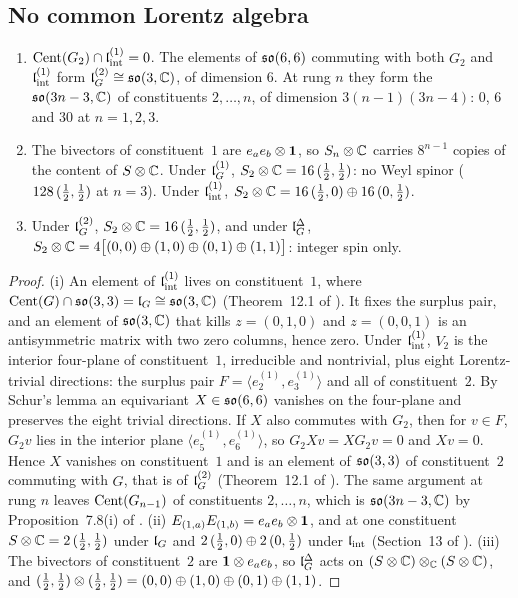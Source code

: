 \subsection{No common Lorentz algebra}
\label{e5:sec:nocommon}

\begin{proposition}
\label{e5:prop:nocommon}
\begin{enumerate}[label=(\roman*),leftmargin=2.2em]
\item $\operatorname{Cent}(G_2)\cap\mathfrak l_{\rm int}^{(1)}=0$. The elements of $\mathfrak{so}(6,6)$ commuting with both $G_2$ and $\mathfrak l_{\rm int}^{(1)}$ form $\mathfrak l_G^{(2)}\cong\mathfrak{so}(3,\mathbb{C})$, of
dimension $6$. At rung $n$ they form the $\mathfrak{so}(3n-3,\mathbb{C})$ of constituents $2,\dots,n$, of dimension $3(n-1)(3n-4)$: $0$, $6$ and $30$ at
$n=1,2,3$.
\item The bivectors of constituent~$1$ are $e_ae_b\otimes\mathbf 1$, so $S_n\otimes\mathbb{C}$ carries $8^{n-1}$ copies of the content of $S\otimes\mathbb{C}$. Under
$\mathfrak l_G^{(1)}$, $S_2\otimes\mathbb{C}=16\,(\tfrac12,\tfrac12)$: no Weyl spinor ($128\,(\tfrac12,\tfrac12)$ at $n=3$). Under $\mathfrak l_{\rm int}^{(1)}$,
$S_2\otimes\mathbb{C}=16\,(\tfrac12,0)\oplus16\,(0,\tfrac12)$.
\item Under $\mathfrak l_G^{(2)}$, $S_2\otimes\mathbb{C}=16\,(\tfrac12,\tfrac12)$, and under $\mathfrak l_G^\Delta$,
$S_2\otimes\mathbb{C}=4\bigl[(0,0)\oplus(1,0)\oplus(0,1)\oplus(1,1)\bigr]$: integer spin only.
\end{enumerate}
\end{proposition}

\begin{proof}
(i) An element of $\mathfrak l_{\rm int}^{(1)}$ lives on constituent~$1$, where $\operatorname{Cent}(G)\cap\mathfrak{so}(3,3)=\mathfrak l_G\cong\mathfrak{so}(3,\mathbb{C})$ (Theorem~12.1 of \cite{ES17}). It fixes the
surplus pair, and an element of $\mathfrak{so}(3,\mathbb{C})$ that kills $z=(0,1,0)$ and $z=(0,0,1)$ is an antisymmetric matrix with two zero columns, hence zero. Under
$\mathfrak l_{\rm int}^{(1)}$, $V_2$ is the interior four-plane of constituent~$1$, irreducible and nontrivial, plus eight Lorentz-trivial directions: the surplus
pair $F=\langle e^{(1)}_2,e^{(1)}_3\rangle$ and all of constituent~$2$. By Schur's lemma an equivariant $X\in\mathfrak{so}(6,6)$ vanishes on the four-plane
and preserves the eight trivial directions. If $X$ also commutes with $G_2$, then for $v\in F$, $G_2v$ lies in the interior plane
$\langle e^{(1)}_5,e^{(1)}_6\rangle$, so $G_2Xv=XG_2v=0$ and $Xv=0$. Hence $X$ vanishes on constituent~$1$ and is an element of $\mathfrak{so}(3,3)$ of
constituent~$2$ commuting with $G$, that is of $\mathfrak l_G^{(2)}$ (Theorem~12.1 of \cite{ES17}). The same argument at rung $n$ leaves
$\operatorname{Cent}(G_{n-1})$ of constituents $2,\dots,n$, which is $\mathfrak{so}(3n-3,\mathbb{C})$ by Proposition~7.8(i) of \cite{RE}. (ii) $E_{(1,a)}E_{(1,b)}=e_ae_b\otimes\mathbf 1$,
and at one constituent $S\otimes\mathbb{C}=2\,(\tfrac12,\tfrac12)$ under $\mathfrak l_G$ and $2\,(\tfrac12,0)\oplus2\,(0,\tfrac12)$ under $\mathfrak l_{\rm int}$ (Section~13 of \cite{ES17}).
(iii) The bivectors of constituent~$2$ are $\mathbf 1\otimes e_ae_b$, so $\mathfrak l_G^\Delta$ acts on $(S\otimes\mathbb{C})\otimes_{\mathbb{C}}(S\otimes\mathbb{C})$, and
$(\tfrac12,\tfrac12)\otimes(\tfrac12,\tfrac12)=(0,0)\oplus(1,0)\oplus(0,1)\oplus(1,1)$.
\end{proof}

